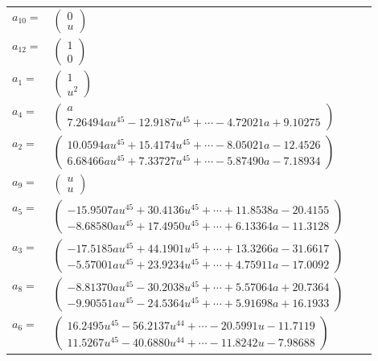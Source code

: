 \documentclass[1p]{elsarticle_modified}
\theoremstyle{definition}
\begin{document}
\begin{tabular}{m{7pt} m{180pt} m{7pt} m{180pt} }
\flushright $a_{10}=$&$\begin{pmatrix}0\\u\end{pmatrix}$ \\
\flushright $a_{12}=$&$\begin{pmatrix}1\\0\end{pmatrix}$ \\
\flushright $a_{1}=$&$\begin{pmatrix}1\\u^2\end{pmatrix}$ \\
\flushright $a_{4}=$&$\begin{pmatrix}a\\7.26494 a u^{45}-12.9187 u^{45}+\cdots-4.72021 a+9.10275\end{pmatrix}$ \\
\flushright $a_{2}=$&$\begin{pmatrix}10.0594 a u^{45}+15.4174 u^{45}+\cdots-8.05021 a-12.4526\\6.68466 a u^{45}+7.33727 u^{45}+\cdots-5.87490 a-7.18934\end{pmatrix}$ \\
\flushright $a_{9}=$&$\begin{pmatrix}u\\u\end{pmatrix}$ \\
\flushright $a_{5}=$&$\begin{pmatrix}-15.9507 a u^{45}+30.4136 u^{45}+\cdots+11.8538 a-20.4155\\-8.68580 a u^{45}+17.4950 u^{45}+\cdots+6.13364 a-11.3128\end{pmatrix}$ \\
\flushright $a_{3}=$&$\begin{pmatrix}-17.5185 a u^{45}+44.1901 u^{45}+\cdots+13.3266 a-31.6617\\-5.57001 a u^{45}+23.9234 u^{45}+\cdots+4.75911 a-17.0092\end{pmatrix}$ \\
\flushright $a_{8}=$&$\begin{pmatrix}-8.81370 a u^{45}-30.2038 u^{45}+\cdots+5.57064 a+20.7364\\-9.90551 a u^{45}-24.5364 u^{45}+\cdots+5.91698 a+16.1933\end{pmatrix}$ \\
\flushright $a_{6}=$&$\begin{pmatrix}16.2495 u^{45}-56.2137 u^{44}+\cdots-20.5991 u-11.7119\\11.5267 u^{45}-40.6880 u^{44}+\cdots-11.8242 u-7.98688\end{pmatrix}$ \\

\end{tabular}
\end{document}
